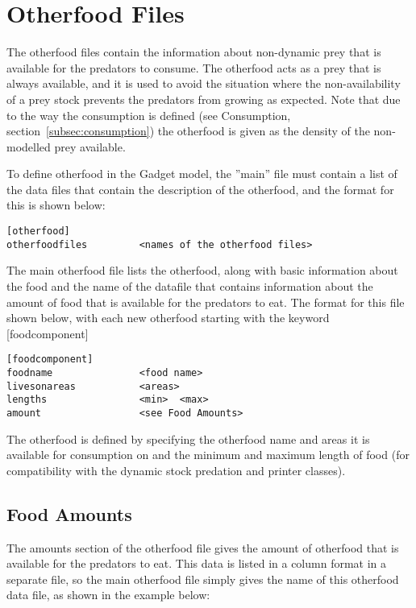 \documentclass [a4paper, 10pt]{book}
\begin{document}
\chapter{Otherfood Files}\label{chap:other}
The otherfood files contain the information about non-dynamic prey that is available for the predators to consume.  The otherfood acts as a prey that is always available, and it is used to avoid the situation where the non-availability of a prey stock prevents the predators from growing as expected.  Note that due to the way the consumption is defined (see Consumption, section~\ref{subsec:consumption}) the otherfood is given as the density of the non-modelled prey available.

\bigskip
To define otherfood in the Gadget model, the ''main'' file must contain a list of the data files that contain the description of the otherfood, and the format for this is shown below:

{\small\begin{verbatim}
[otherfood]
otherfoodfiles         <names of the otherfood files>
\end{verbatim}}

The main otherfood file lists the otherfood, along with basic information about the food and the name of the datafile that contains information about the amount of food that is available for the predators to eat.  The format for this file shown below, with each new otherfood starting with the keyword [foodcomponent]

{\small\begin{verbatim}
[foodcomponent]
foodname               <food name>
livesonareas           <areas>
lengths                <min>  <max>
amount                 <see Food Amounts>
\end{verbatim}}

The otherfood is defined by specifying the otherfood name and areas it is available for consumption on and the minimum and maximum length of food (for compatibility with the dynamic stock predation and printer classes).

\newpage
\section{Food Amounts}\label{sec:foodamounts}
The amounts section of the otherfood file gives the amount of otherfood that is available for the predators to eat.  This data is listed in a column format in a separate file, so the main otherfood file simply gives the name of this otherfood data file, as shown in the example below:
\end{document}
